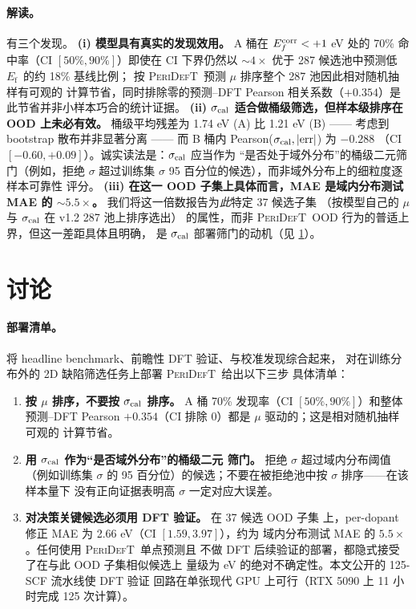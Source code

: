 \documentclass[UTF8,11pt,a4paper]{ctexart}
\newcommand{\Ef}{$E_{\mathrm{f}}$}
\newcommand{\modelname}{\textsc{PeriDefT}}
\begin{document}
\paragraph{解读。}
有三个发现。
\textbf{(i) 模型具有真实的发现效用。} A 桶在 $E_f^{\rm corr}<+1$ eV
处的 70\% 命中率（CI $[50\%, 90\%]$）即使在 CI 下界仍然以
$\sim 4\times$ 优于 287 候选池中预测低 \Ef\ 的约 18\% 基线比例；
按 \modelname\ 预测 $\mu$ 排序整个 287 池因此相对随机抽样有可观的
计算节省，同时排除零的预测--DFT Pearson 相关系数（$+0.354$）是
此节省并非小样本巧合的统计证据。
\textbf{(ii) $\sigma_{\rm cal}$ 适合做桶级筛选，但样本级排序在
OOD 上未必有效。} 桶级平均残差为 1.74 eV (A) 比 1.21 eV (B) ——
考虑到 bootstrap 散布并非显著分离 —— 而 B 桶内
Pearson($\sigma_{\rm cal}, |\mathrm{err}|$) 为 $-0.288$
（CI $[-0.60, +0.09]$）。诚实读法是：$\sigma_{\rm cal}$ 应当作为
``是否处于域外分布''的桶级二元筛门（例如，拒绝 $\sigma$ 超过训练集
$\sigma$ 95 百分位的候选），而非域外分布上的细粒度逐样本可靠性
评分。
\textbf{(iii) 在这一 OOD 子集上具体而言，MAE 是域内分布测试 MAE 的
$\sim 5.5\times$。} 我们将这一倍数报告为\emph{此}特定 37 候选子集
（按模型自己的 $\mu$ 与 $\sigma_{\rm cal}$ 在 v1.2 287 池上排序选出）
的属性，而非 \modelname\ OOD 行为的普适上界，但这一差距具体且明确，
是 $\sigma_{\rm cal}$ 部署筛门的动机（见 \ref{sec:disc_short}）。

\section{讨论}\label{sec:disc_short}

\paragraph{部署清单。}
将 headline benchmark、前瞻性 DFT 验证、与校准发现综合起来，
对在训练分布外的 2D 缺陷筛选任务上部署 \modelname\ 给出以下三步
具体清单：

\begin{enumerate}[leftmargin=20pt, itemsep=3pt]
\item \textbf{按 $\mu$ 排序，不要按 $\sigma_{\rm cal}$ 排序。}
A 桶 70\% 发现率（CI $[50\%, 90\%]$）和整体预测--DFT Pearson
$+0.354$（CI 排除 0）都是 $\mu$ 驱动的；这是相对随机抽样可观的
计算节省。
\item \textbf{用 $\sigma_{\rm cal}$ 作为``是否域外分布''的桶级二元
筛门。} 拒绝 $\sigma$ 超过域内分布阈值（例如训练集 $\sigma$ 的
95 百分位）的候选；不要在被拒绝池中按 $\sigma$ 排序——在该样本量下
没有正向证据表明高 $\sigma$ 一定对应大误差。
\item \textbf{对决策关键候选必须用 DFT 验证。} 在 37 候选 OOD 子集
上，per-dopant 修正 MAE 为 2.66 eV（CI $[1.59, 3.97]$），约为
域内分布测试 MAE 的 $5.5\times$。任何使用 \modelname\ 单点预测且
不做 DFT 后续验证的部署，都隐式接受了在与此 OOD 子集相似候选上
量级为 eV 的绝对不确定性。本文公开的 125-SCF 流水线使 DFT 验证
回路在单张现代 GPU 上可行（RTX 5090 上 11 小时完成 125 次计算）。
\end{enumerate}
\end{document}
